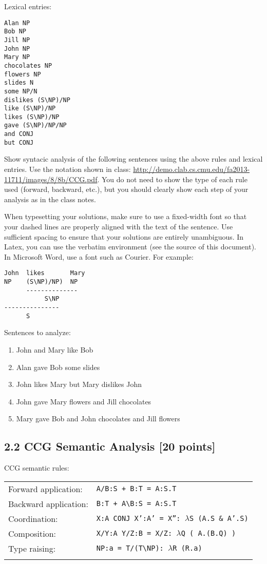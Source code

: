 \documentclass[11pt,letterpaper]{article}
\begin{document}
\noindent{}Lexical entries:

\begin{verbatim}
Alan NP
Bob NP
Jill NP
John NP
Mary NP
chocolates NP
flowers NP
slides N
some NP/N
dislikes (S\NP)/NP
like (S\NP)/NP
likes (S\NP)/NP
gave (S\NP)/NP/NP
and CONJ
but CONJ
\end{verbatim}

\noindent{}Show syntacic analysis of the following sentences using the above rules and lexical entries.  Use the notation shown in class: \url{http://demo.clab.cs.cmu.edu/fa2013-11711/images/8/8b/CCG.pdf}.  You do not need to show the type of each rule used (forward, backward, etc.), but you should clearly show each step of your analysis as in the class notes.

When typesetting your solutions, make sure to use a fixed-width font so that your dashed lines are properly aligned with the text of the sentence. Use sufficient spacing to ensure that your solutions are entirely unambiguous. In Latex, you can use the verbatim environment (see the source of this document). In Microsoft Word, use a font such as Courier. For example:

\begin{verbatim}
John  likes       Mary
NP    (S\NP)/NP)  NP
      --------------
           S\NP
---------------
      S
\end{verbatim}

\noindent Sentences to analyze:

\begin{enumerate}
\item John and Mary like Bob
\item Alan gave Bob some slides
\item John likes Mary but Mary dislikes John
\item John gave Mary flowers and Jill chocolates
\item Mary gave Bob and John chocolates and Jill flowers
\end{enumerate}


\subsection*{2.2 CCG Semantic Analysis [20 points]}
\label{ss:ccgsem}

\noindent{}CCG semantic rules:
\newline

\noindent\begin{tabular}{ll}
Forward application: & \texttt{A/B:S + B:T = A:S.T} \\
Backward application: & \texttt{B:T + A\textbackslash{}B:S = A:S.T} \\
Coordination: & \texttt{X:A CONJ X':A' = X'': $\lambda$S (A.S \& A'.S)} \\
Composition: & \texttt{X/Y:A Y/Z:B = X/Z: $\lambda$Q ( A.(B.Q) )} \\
Type raising: & \texttt{NP:a = T/(T\textbackslash{}NP): $\lambda$R (R.a)} \\
\newline
\end{tabular}
\end{document}
